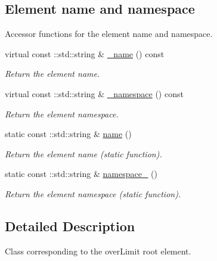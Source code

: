\subsection*{Element name and namespace}
\label{_amgrpd4b5b61f6e07390f4af2465e04571f34}
Accessor functions for the element name and namespace. \begin{DoxyCompactItemize}
\item 
virtual const ::std::string \& \hyperlink{classopenstack_1_1xml_1_1OverLimit_a153e8d34ec3ceef66f193b0124ab64e1}{\_\-name} () const 
\begin{DoxyCompactList}\small\item\em Return the element name. \item\end{DoxyCompactList}\item 
virtual const ::std::string \& \hyperlink{classopenstack_1_1xml_1_1OverLimit_a2dc03c1294389ddfd3df1beeae8d8e7a}{\_\-namespace} () const 
\begin{DoxyCompactList}\small\item\em Return the element namespace. \item\end{DoxyCompactList}\item 
static const ::std::string \& \hyperlink{classopenstack_1_1xml_1_1OverLimit_a6e2afb7a897ce0477396bf296062c5bf}{name} ()
\begin{DoxyCompactList}\small\item\em Return the element name (static function). \item\end{DoxyCompactList}\item 
static const ::std::string \& \hyperlink{classopenstack_1_1xml_1_1OverLimit_a041045f3e0c16d72f206e418a16b19a5}{namespace\_\-} ()
\begin{DoxyCompactList}\small\item\em Return the element namespace (static function). \item\end{DoxyCompactList}\end{DoxyCompactItemize}


\subsection{Detailed Description}
Class corresponding to the overLimit root element. 

